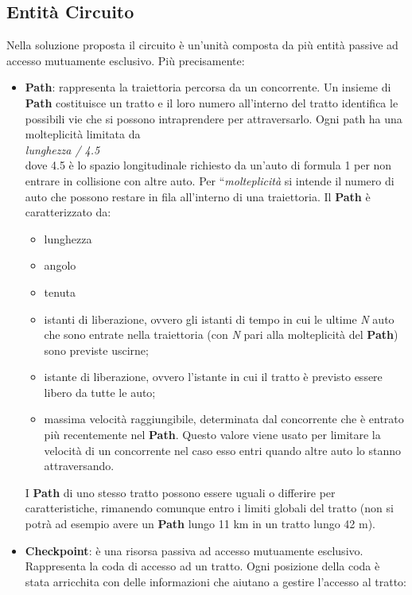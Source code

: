 \label{soluzione_problematiche}
\subsection{Entit\`{a} Circuito}
\label{entita_circuito}
Nella soluzione proposta il circuito è un'unità composta da più entità passive
ad accesso mutuamente esclusivo. Più precisamente:
\begin{itemize}
\item \textbf{Path}: rappresenta la traiettoria percorsa da un concorrente. Un
insieme di \textbf{Path} costituisce un tratto e il loro
numero all'interno del tratto identifica le possibili vie che si possono intraprendere per attraversarlo. 
Ogni path ha una molteplicità limitata da\\
\emph{lunghezza / 4.5}\\
dove 4.5 è lo spazio longitudinale richiesto da un'auto di formula 1 per non entrare in collisione con altre auto. Per ``\emph{molteplicità}
si intende il numero di auto che possono restare in fila all'interno di una traiettoria.
Il \textbf{Path} è caratterizzato da:
\begin{itemize}
\item lunghezza
\item angolo
\item tenuta
\item istanti di liberazione, ovvero gli istanti di tempo 
in cui le ultime \emph{N} auto che sono entrate nella traiettoria (con \emph{N} pari alla molteplicità del \textbf{Path}) sono previste uscirne;
\item istante di liberazione, ovvero l'istante in cui il tratto è previsto essere libero da tutte le auto;
\item massima velocità raggiungibile, determinata dal concorrente che è entrato più recentemente nel \textbf{Path}.
Questo valore viene usato per limitare la velocità di un concorrente nel caso esso entri quando altre auto lo stanno
attraversando.
\end{itemize}
I \textbf{Path} di uno stesso tratto possono essere uguali o differire per
caratteristiche, rimanendo comunque entro i limiti globali del tratto
(non si potrà ad esempio avere un \textbf{Path} lungo 11 km in un tratto lungo 42 m).
\item \textbf{Checkpoint}: è una risorsa passiva ad accesso mutuamente
esclusivo. Rappresenta la coda di accesso ad un tratto. Ogni posizione
della coda è stata arricchita con delle informazioni che aiutano a gestire
l'accesso al tratto:
\begin{itemize}

\end{itemize}
\end{itemize}
